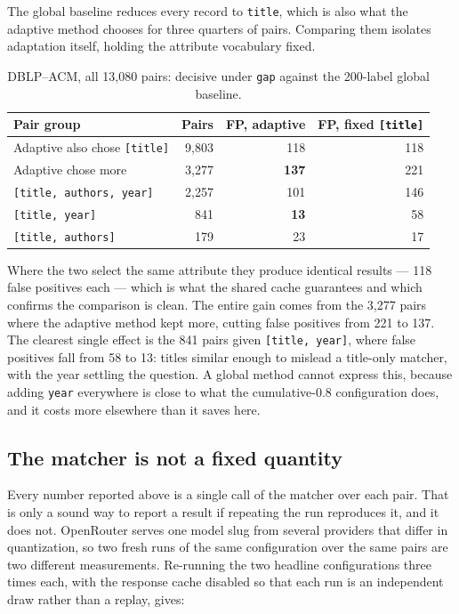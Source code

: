 \documentclass[11pt]{article}
\begin{document}
The global baseline reduces every record to \texttt{title}, which is also what the adaptive
method chooses for three quarters of pairs. Comparing them isolates adaptation itself,
holding the attribute vocabulary fixed.

\begin{table}[h]
\centering
\begin{tabular}{lrrr}
\toprule
Pair group & Pairs & FP, adaptive & FP, fixed \texttt{[title]} \\
\midrule
Adaptive also chose \texttt{[title]} & 9{,}803 & 118 & 118 \\
Adaptive chose more                  & 3{,}277 & \textbf{137} & 221 \\
\midrule
\quad \texttt{[title, authors, year]} & 2{,}257 & 101 & 146 \\
\quad \texttt{[title, year]}          &    841 &  \textbf{13} &  58 \\
\quad \texttt{[title, authors]}       &    179 &  23 &  17 \\
\bottomrule
\end{tabular}
\caption{DBLP--ACM, all 13{,}080 pairs: decisive under \texttt{gap} against the 200-label
global baseline.}
\end{table}

Where the two select the same attribute they produce identical results --- 118 false
positives each --- which is what the shared cache guarantees and which confirms the
comparison is clean. The entire gain comes from the 3{,}277 pairs where the adaptive method
kept more, cutting false positives from 221 to 137. The clearest single effect is the 841
pairs given \texttt{[title, year]}, where false positives fall from 58 to 13: titles similar
enough to mislead a title-only matcher, with the year settling the question. A global method
cannot express this, because adding \texttt{year} everywhere is close to what the
cumulative-0.8 configuration does, and it costs more elsewhere than it saves here.

\subsection{The matcher is not a fixed quantity}
\label{sec:draws}

Every number reported above is a single call of the matcher over each pair. That is only a
sound way to report a result if repeating the run reproduces it, and it does not.
OpenRouter serves one model slug from several providers that differ in quantization, so two
fresh runs of the same configuration over the same pairs are two different measurements.
Re-running the two headline configurations three times each, with the response cache
disabled so that each run is an independent draw rather than a replay, gives:
\end{document}
